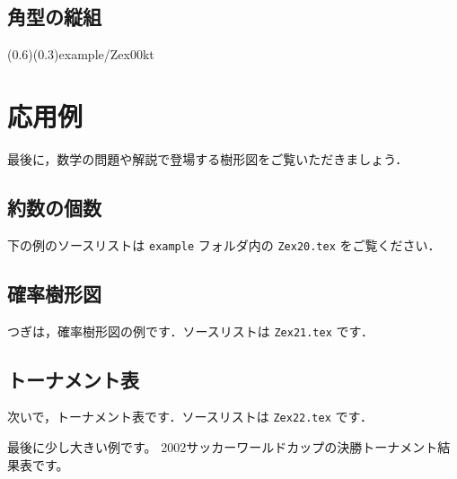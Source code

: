 \documentclass[a4j]{jarticle}
\begin{document}
\subsection{角型の縦組}

\showexample[角型（縦）](0.6)(0.3){example/Zex00kt}
\clearpage

\section{応用例}
最後に，数学の問題や解説で登場する樹形図をご覧いただきましょう．

\subsection{約数の個数}
下の例のソースリストは \texttt{example} フォルダ内の
\texttt{Zex20.tex} をご覧ください．


\clearpage

\subsection{確率樹形図}
つぎは，確率樹形図の例です．ソースリストは \texttt{Zex21.tex} です．



\subsection{トーナメント表}
次いで，トーナメント表です．ソースリストは \texttt{Zex22.tex} です．



最後に少し大きい例です。
2002サッカーワールドカップの決勝トーナメント結果表です。

\end{document}
